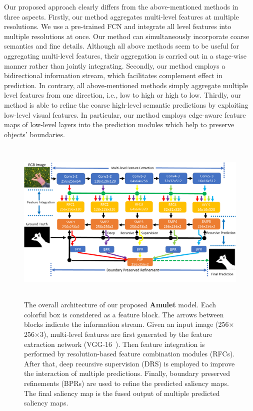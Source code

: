\documentclass[10pt,twocolumn,letterpaper]{article}
\begin{document}
Our proposed approach clearly differs from the above-mentioned methods in three aspects.
Firstly, our method aggregates multi-level features at multiple resolutions. We use a pre-trained FCN and integrate all level features into multiple resolutions at once. Our method can simultaneously incorporate coarse semantics and fine details. %
%
Although all above methods seem to be useful for aggregating multi-level features, their aggregation is carried out in a stage-wise manner rather than jointly integrating.
%
Secondly, our method employs a bidirectional information stream, which facilitates complement effect in prediction.
%
In contrary, all above-mentioned methods simply aggregate multiple level features from one direction, i.e., low to high or high to low.
%
Thirdly, our method is able to refine the coarse high-level semantic predictions by exploiting low-level visual features.
%
In particular, our method employs edge-aware feature maps of low-level layers into the prediction modules which help to preserve objects' boundaries.
\begin{figure}
\begin{center}
\includegraphics[width=0.95\linewidth,height=8.0cm]{Amulet_V62.pdf}
\end{center}
\vspace{-4mm}
\caption{The overall architecture of our proposed \textbf{Amulet} model. Each colorful box is considered as a feature block. The arrows between blocks indicate the information stream. Given an input image (256$\times$256$\times$3), multi-level features are first generated by the feature extraction network (VGG-16~\cite{simonyan2014very}). Then feature integration is performed by resolution-based feature combination modules (RFCs). After that, deep recursive supervision (DRS) is employed to improve the interaction of multiple predictions. Finally, boundary preserved refinements (BPRs) are used to refine the predicted saliency maps. The final saliency map is the fused output of multiple predicted saliency maps.}
\label{fig:Amulet}
\vspace{-5mm}
\end{figure}
\end{document}
